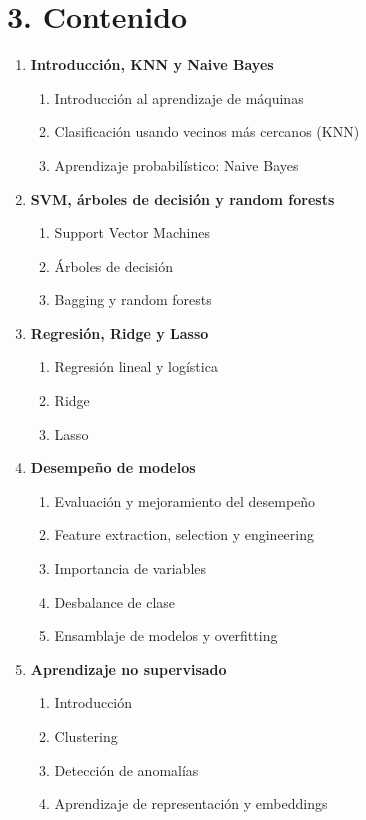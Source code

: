 \documentclass[11pt]{article}
\begin{document}
\section*{3. Contenido}

\begin{enumerate}[label=\Roman*., leftmargin=*, itemsep=4pt]
  \item \textbf{Introducción, KNN y Naive Bayes}
  \begin{enumerate}[label=\alph*.]
    \item Introducción al aprendizaje de máquinas
    \item Clasificación usando vecinos más cercanos (KNN)
    \item Aprendizaje probabilístico: Naive Bayes
  \end{enumerate}

  \item \textbf{SVM, árboles de decisión y random forests}
  \begin{enumerate}[label=\alph*.]
    \item Support Vector Machines
    \item Árboles de decisión
    \item Bagging y random forests
  \end{enumerate}

  \item \textbf{Regresión, Ridge y Lasso}
  \begin{enumerate}[label=\alph*.]
    \item Regresión lineal y logística
    \item Ridge
    \item Lasso
  \end{enumerate}

  \item \textbf{Desempeño de modelos}
  \begin{enumerate}[label=\alph*.]
    \item Evaluación y mejoramiento del desempeño
    \item Feature extraction, selection y engineering
    \item Importancia de variables
    \item Desbalance de clase
    \item Ensamblaje de modelos y overfitting
  \end{enumerate}

  \item \textbf{Aprendizaje no supervisado}
  \begin{enumerate}[label=\alph*.]
    \item Introducción
    \item Clustering
    \item Detección de anomalías
    \item Aprendizaje de representación y embeddings
  \end{enumerate}


\end{enumerate}
\end{document}
